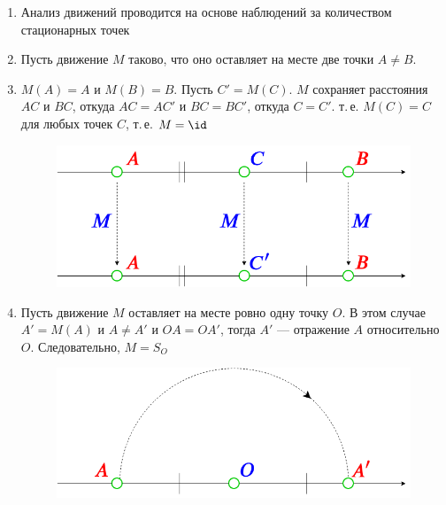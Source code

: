 \begin{enumerate}
\item Анализ движений проводится на основе наблюдений за количеством стационарных точек
\item Пусть движение $M$ таково, что оно оставляет на месте две точки $A\ne B$.
\item $M(A)=A$ и $M(B)=B$. Пусть $C'=M(C)$. $M$ сохраняет расстояния $AC$ и $BC$, откуда $AC=AC'$ и $BC=BC'$, откуда $C=C'$. т.\,е. $M(C)=C$ для любых точек $C$, т.\,е. $M=\id$

\begin{figure}[hbt!]
\begin{center}
\includegraphics[scale=0.35]{LineMoving.png}
\end{center}
\caption{}\label{LineMoving}
\end{figure}
\item Пусть движение $M$ оставляет на месте ровно одну точку $O$. В этом случае $A'=M(A)$ и $A\ne A'$ и $OA=OA'$, тогда $A'$ --- отражение $A$ относительно $O$. Следовательно, $M=S_O$
\begin{figure}[hbt!]
\begin{center}
\includegraphics[scale=0.35]{LineMovingO.png}
\end{center}
\caption{}\label{LineMovingO}
\end{figure}


\end{enumerate}
